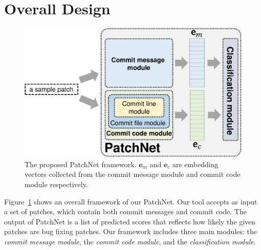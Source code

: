 \section{Overall Design}
\label{sec:design}

\begin{figure}[!t]
	\center
	\includegraphics[scale=0.38]{figures/overall_patchnet.pdf}
	\caption{The proposed PatchNet framework. $\textbf{e}_m$ and $\textbf{e}_c$ are embedding vectors collected from the commit message module and commit code module respectively.}
	\label{fig:patchnet}
    \vspace{-0.4cm}
\end{figure}

Figure~\ref{fig:patchnet} shows an overall framework of our PatchNet. Our tool accepts as input a set of patches, which contain both commit messages and commit code. The output of PatchNet is a list of predicted scores that reflects how likely the given patches are bug fixing patches. Our framework includes three main modules: the \textit{commit message module}, the \textit{commit code module}, and the \textit{classification module}.